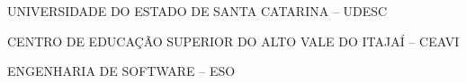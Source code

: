 

\renewcommand{\imprimircapa}{%
	\begin{capa}%
		\center

		{\fontseries{b}\selectfont\MakeTextUppercase{UNIVERSIDADE DO ESTADO DE SANTA CATARINA -- UDESC}}

		{\fontseries{b}\selectfont\MakeTextUppercase{CENTRO DE EDUCAÇÃO SUPERIOR DO ALTO VALE DO ITAJAÍ -- CEAVI  }}

		{\fontseries{b}\selectfont\MakeTextUppercase{ENGENHARIA DE SOFTWARE -- ESO  }}

		\vfill

		{\fontseries{b}\selectfont\MakeTextUppercase{\normalsize\imprimirautor}}

		\vfill
		\begin{center}
			{\fontseries{b}\selectfont\MakeTextUppercase{\imprimirtitulo}}
		\end{center}
		\vfill

		\vfill

		{\fontseries{b}\selectfont\MakeTextUppercase{\imprimirlocal}}
		\par
		{\selectfont \imprimirdata}
		\vspace*{1cm}
	\end{capa}
}



\imprimircapa				%

